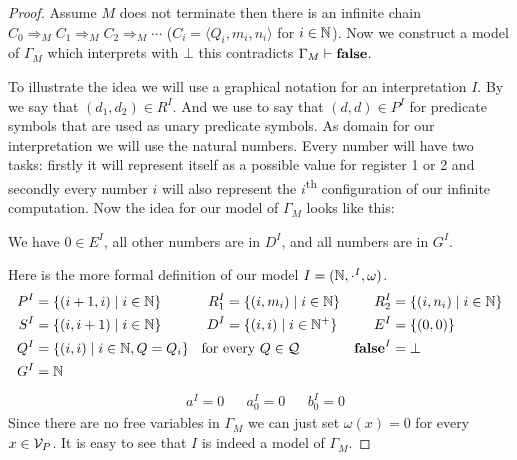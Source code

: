 \begin{proof}
	Assume $M$ does not terminate then there is an infinite chain $C_0\Rightarrow_M C_1\Rightarrow_M C_2\Rightarrow_M\cdots$ ($C_i=\langle Q_i,m_i,n_i\rangle$ for $i\in\mathbb{N}$). Now we construct a model of $\Gamma_M$ which interprets \false{} with $\bot$ this contradicts $\Gamma_M\vdash\textbf{false}$.

	To illustrate the idea we will use a graphical notation for an interpretation $I$.
	By
	we say that $(d_1,d_2)\in R^I$. And we use
	to say that $(d,d)\in P^I$ for predicate symbols that are used as unary predicate symbols. 
	As domain for our interpretation we will use the natural numbers. Every number will have two tasks: firstly it will represent itself as a possible value for register 1 or 2 and secondly every number $i$ will also represent the $i$\textsuperscript{th} configuration of our infinite computation.
	Now the idea for our model of $\Gamma_M$ looks like this:
	
	\begin{figure}[H]
		\centering
		
	\end{figure}
	We have $0\in E^I$, all other numbers are in $D^I$, and all numbers are in $G^I$.
	
	Here is the more formal definition of our model $I=(\mathbb{N},\cdot^I,\omega)$.
	\begin{align*}
		  P^I&=\{(i+1,i)\mid i\in\N\}              & R_1^I&=\{(i,m_i)\mid i\in\N\} & R_2^I&=\{(i,n_i)\mid i\in\N\} \\
		  S^I&=\{(i,i+1)\mid i\in\N\} &  D^I&=\{(i,i)\mid i\in\N^+\}         & E^I&=\{(0,0)\}                            \\
		  Q^I&=\{(i,i)\mid i\in\N, Q=Q_i\} \makebox[1mm]{\hspace{3cm}\text{for every $Q\in\autStates$}}& && \false^I&=\bot \\
		  G^I&=\N
	\end{align*}
	\begin{align*}
		  & a^I=0 &   & a_0^I=0 &   & b_0^I=0 
	\end{align*}
	Since there are no free variables in $\Gamma_M$ we can just set $\omega(x)=0$ for every $x\in\mathcal{V}_P$. It is easy to see that $I$ is indeed a model of $\Gamma_M$.
\end{proof}

